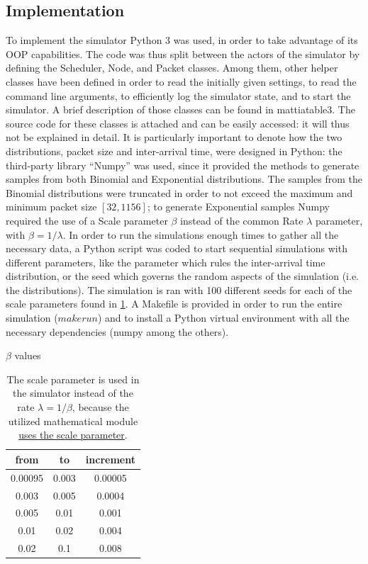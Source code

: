 \documentclass[conference]{IEEEtran}
\begin{document}
\subsection{Implementation}\label{sec:implementation}
To implement the simulator Python 3 was used, in order to take advantage of its OOP capabilities. The code was thus split between the actors of the simulator by defining the Scheduler, Node, and Packet classes. Among them, other helper classes have been defined in order to read the initially given settings, to read the command line arguments, to efficiently log the simulator state, and to start the simulator. A brief description of those classes can be found in mattiatable3. The source code for these classes is attached and can be easily accessed: it will thus not be explained in detail. It is particularly important to denote how the two distributions, packet size and inter-arrival time, were designed in Python: the third-party library “Numpy” was used, since it provided the methods to generate samples from both Binomial and Exponential distributions. The samples from the Binomial distributions were truncated in order to not exceed the maximum and minimum packet size \([32, 1156]\); to generate Exponential samples Numpy required the use of a Scale parameter \(\beta\) instead of the common Rate \(\lambda\) parameter, with \(\beta=1/\lambda\). In order to run the simulations enough times to gather all the necessary data, a Python script was coded to start sequential simulations with different parameters, like the parameter which rules the inter-arrival time distribution, or the seed which governs the random aspects of the simulation (i.e. the distributions). The simulation is ran with 100 different seeds for each of the scale parameters found in \cref{tab:scalevalues}. A Makefile is provided in order to run the entire simulation (\(make run\)) and to install a Python virtual environment with all the necessary dependencies (numpy among the others).

\begin{table}
    \centering
    \caption{\(\beta\) values}
    \label{tab:scalevalues}
    \begin{tabular}{cc|c}
        \toprule
        from & to & increment \\
        \midrule
        \num{0.00095} & \num{0.003} & \num{0.00005} \\
        \num{0.003} & \num{0.005} & \num{0.0004} \\
        \num{0.005} & \num{0.01} & \num{0.001} \\
        \num{0.01} & \num{0.02} & \num{0.004} \\
        \num{0.02} & \num{0.1} & \num{0.008} \\
        \bottomrule
    \end{tabular}
    \caption{The scale parameter is used in the simulator instead of the rate \(\lambda=1/\beta\), because the utilized mathematical module \href{https://docs.scipy.org/doc/numpy-1.13.0/reference/generated/numpy.random.exponential.html}{uses the scale parameter}.}
\end{table}
\end{document}
